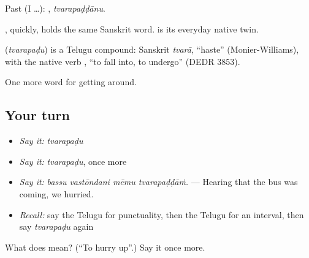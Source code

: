 Past (I …): , \emph{tvarapaḍḍānu}.

, quickly, holds the same Sanskrit word.  is its everyday native twin.

\begin{cousinweb}
\textbf{} (\emph{tvarapaḍu}) is a Telugu compound: Sanskrit \emph{tvarā}, \textquotedblleft{}haste\textquotedblright{} (Monier-Williams), with the native verb , \textquotedblleft{}to fall into, to undergo\textquotedblright{} (DEDR 3853).
\end{cousinweb}

\begin{grammarlens}[title={What you've built}]
One more word for getting around.
\end{grammarlens}

\subsection*{Your turn}
\begin{itemize}
\raggedright
  \item \emph{Say it:} \emph{tvarapaḍu}
  \item \emph{Say it:} \emph{tvarapaḍu}, once more
  \item \emph{Say it:} \emph{bassu vastōndani mēmu tvarapaḍḍāṁ.} — Hearing that the bus was coming, we hurried.
  \item \emph{Recall:} say the Telugu for punctuality, then the Telugu for an interval, then say \emph{tvarapaḍu} again
\end{itemize}

\begin{tcolorbox}[breakable,colback=teal!4,colframe=teal!35!black,title={Before you move on}]
What does  mean? (\textquotedblleft{}To hurry up\textquotedblright{}.) Say it once more.
\end{tcolorbox}
